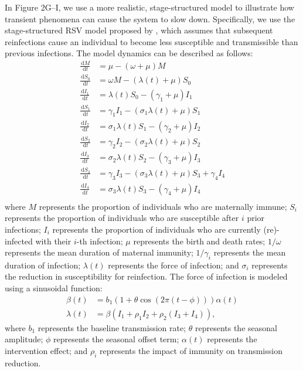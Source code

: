 \documentclass[12pt]{article}
\newcommand{\dd}[1]{\ensuremath{\, \mathrm{d}#1}}
\begin{document}
In Figure 2G--I, we use a more realistic, stage-structured model to illustrate how transient phenomena can cause the system to slow down.
Specifically, we use the stage-structured RSV model proposed by \citep{pitzer2015environmental}, which assumes that subsequent reinfections cause an individual to become less susceptible and transmissible than previous infections.
The model dynamics can be described as follows:
\begin{align}
\frac{\dd M}{\dd t} &= \mu - (\omega + \mu) M\\
\frac{\dd S_0}{\dd t} &= \omega M - (\lambda(t) + \mu) S_0\\
\frac{\dd I_1}{\dd t} &= \lambda(t) S_0 - (\gamma_1 + \mu) I_1\\
\frac{\dd S_1}{\dd t} &= \gamma_1 I_1 - (\sigma_1 \lambda(t) + \mu) S_1\\
\frac{\dd I_2}{\dd t} &= \sigma_1 \lambda(t) S_1 - (\gamma_2 + \mu) I_2\\
\frac{\dd S_2}{\dd t} &= \gamma_2 I_2 - (\sigma_2 \lambda(t) + \mu) S_2\\
\frac{\dd I_3}{\dd t} &= \sigma_2 \lambda(t) S_2 - (\gamma_3 + \mu) I_3\\
\frac{\dd S_3}{\dd t} &= \gamma_3 I_3 - (\sigma_3 \lambda(t) + \mu) S_3 + \gamma_4 I_4\\
\frac{\dd I_4}{\dd t} &= \sigma_3 \lambda(t) S_3 - (\gamma_4 + \mu) I_4\\
\end{align}
where $M$ represents the proportion of individuals who are maternally immune;
$S_i$ represents the proportion of individuals who are susceptible after $i$ prior infections;
$I_i$ represents the proportion of individuals who are currently (re)-infected with their $i$-th infection;
$\mu$ represents the birth and death rates;
$1/\omega$ represents the mean duration of maternal immunity;
$1/\gamma_i$ represents the mean duration of infection;
$\lambda(t)$ represents the force of infection;
and $\sigma_i$ represents the reduction in susceptibility for reinfection.
The force of infection is modeled using a sinusoidal function:
\begin{align}
\beta(t) &= b_1 (1 + \theta \cos(2 \pi (t-\phi))) \alpha(t)\\
\lambda(t) &= \beta (I_1 + \rho_1 I_2 + \rho_2 (I_3 + I_4)), 
\end{align}
where $b_1$ represents the baseline transmission rate; $\theta$ represents the seasonal amplitude; $\phi$ represents the seasonal offset term; $\alpha(t)$ represents the intervention effect; and $\rho_i$ represents the impact of immunity on transmission reduction.
\end{document}
